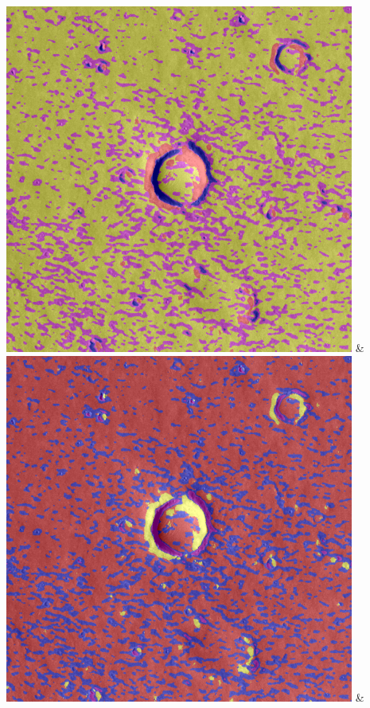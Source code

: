 \begin{table}[h!]
\begin{tabularx}{\textwidth}
		\includegraphics[width=0.9\linewidth]{images/gen/spatial_weight/p03_01.png_0.33.png} &
		\includegraphics[width=0.9\linewidth]{images/gen/spatial_weight/p03_01.png_0.66.png} &

\end{tabularx}
\end{table}
